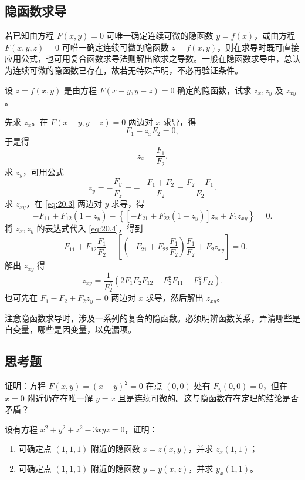 \subsection{隐函数求导}

若已知由方程 $F(x,y)=0$ 可唯一确定连续可微的隐函数 $y=f(x)$，或由方程 $F(x,y,z)=0$ 可唯一确定连续可微的隐函数 $z=f(x,y)$，则在求导时既可直接应用公式，也可用复合函数求导法则解出欲求之导数。一般在隐函数求导中，总认为连续可微的隐函数已存在，故若无特殊声明，不必再验证条件。

\begin{xexample}[20.1.3]
设 $z=f(x,y)$ 是由方程 $F(x-y,y-z)=0$ 确定的隐函数，试求 $z_x,z_y$ 及 $z_{xy}$。
\end{xexample}
\begin{xsolution}
先求 $z_x$。在 $F(x-y,y-z)=0$ 两边对 $x$ 求导，得
\begin{equation}
  F_1-z_xF_2=0,
  \tag{20.3}
  \label{eq:20.3}
\end{equation}
于是得
\[
  z_x=\frac{F_1}{F_2}.
\]
求 $z_y$，可用公式
\[
  z_y=-\frac{F_y}{F_z}
  =-\frac{-F_1+F_2}{-F_2}
  =\frac{F_2-F_1}{F_2}.
\]
求 $z_{xy}$，在 \eqref{eq:20.3} 两边对 $y$ 求导，得
\begin{equation}
  -F_{11}+F_{12}(1-z_y)
  -\left\{[-F_{21}+F_{22}(1-z_y)]z_x+F_2z_{xy}\right\}=0.
  \tag{20.4}
  \label{eq:20.4}
\end{equation}
将 $z_x,z_y$ 的表达式代入 \eqref{eq:20.4}，得到
\[
  -F_{11}+F_{12}\frac{F_1}{F_2}
  -\left[\left(-F_{21}+F_{22}\frac{F_1}{F_2}\right)\frac{F_1}{F_2}+F_2z_{xy}\right]=0.
\]
解出 $z_{xy}$ 得
\[
  z_{xy}=\frac{1}{F_2^3}\left(2F_1F_2F_{12}-F_2^2F_{11}-F_1^2F_{22}\right).
\]
也可先在 $F_1-F_2+F_2z_y=0$ 两边对 $x$ 求导，然后解出 $z_{xy}$。
\end{xsolution}

注意隐函数求导时，涉及一系列的复合的隐函数。必须明辨函数关系，弄清哪些是自变量，哪些是因变量，以免漏项。

\subsection{思考题}

\begin{xthought}[1]
证明：方程 $F(x,y)=(x-y)^2=0$ 在点 $(0,0)$ 处有 $F_y(0,0)=0$，但在 $x=0$ 附近仍存在唯一解 $y=x$ 且是连续可微的。这与隐函数存在定理的结论是否矛盾？
\end{xthought}

\begin{xthought}[2]
设有方程 $x^2+y^2+z^2-3xyz=0$，证明：
  \begin{enumerate}[label=(\arabic*)]
    \item 可确定点 $(1,1,1)$ 附近的隐函数 $z=z(x,y)$，并求 $z_x(1,1)$；
    \item 可确定点 $(1,1,1)$ 附近的隐函数 $y=y(x,z)$，并求 $y_x(1,1)$。
  \end{enumerate}
\end{xthought}


